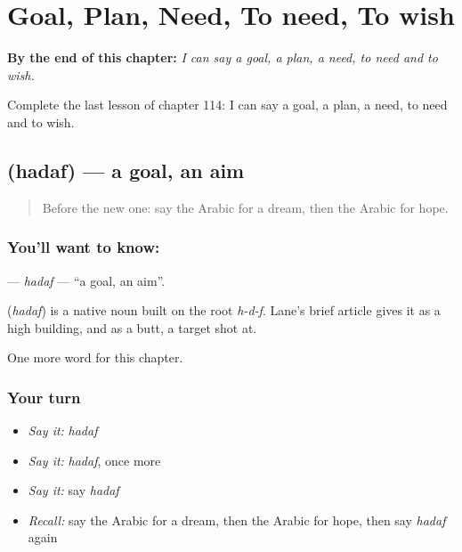 
\chapter{Goal, Plan, Need, To need, To wish}
\label{ch:ar-goal-plan-need-to-need-to-wish}

\begin{chapteropening}
\textbf{By the end of this chapter:} \emph{I can say a goal, a plan, a need, to need and to wish.}

Complete the last lesson of chapter 114: I can say a goal, a plan, a need, to need and to wish.
\end{chapteropening}

\section[\texorpdfstring{\ar{هدف} (hadaf)}{هدف (hadaf)}]{ (hadaf) — a goal, an aim}

\label{lesson:AR-C114-hadaf}



\begin{quote}
Before the new one: say the Arabic for a dream, then the Arabic for hope.
\end{quote}

\subsection*{You'll want to know: }
\textbf{} — \emph{hadaf} — \textquotedblleft{}a goal, an aim\textquotedblright{}.

\begin{cousinweb}
\textbf{} (\emph{hadaf}) is a native noun built on the root \emph{h-d-f}. Lane's brief article gives it as a high building, and as a butt, a target shot at.
\end{cousinweb}

\begin{grammarlens}[title={What you've built}]
One more word for this chapter.
\end{grammarlens}

\subsection*{Your turn}
\begin{itemize}
\raggedright
  \item \emph{Say it:} \emph{hadaf}
  \item \emph{Say it:} \emph{hadaf}, once more
  \item \emph{Say it:} say \emph{hadaf}
  \item \emph{Recall:} say the Arabic for a dream, then the Arabic for hope, then say \emph{hadaf} again
\end{itemize}

